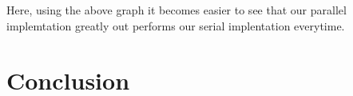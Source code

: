 \documentclass[paper=a4, fontsize=11pt]{scrartcl} %
\numberwithin{equation}{section} %
\numberwithin{figure}{section} %
\numberwithin{table}{section} %
\begin{document}
Here, using the above graph it becomes easier to see that our parallel implemtation greatly out performs our serial implentation everytime.








\section{Conclusion}
\end{document}
